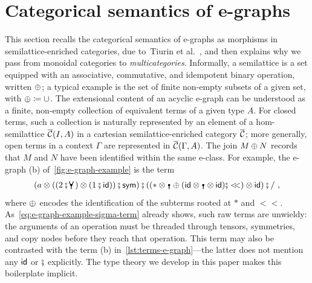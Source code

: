 \section{Categorical semantics of e-graphs}
\label{sec:categorical-semantics}

This section recalls the categorical semantics of e-graphs as morphisms in semilattice-enriched categories, due to~Tiurin et al.~\cite{tiurin2025equivalencehypergraphsdporewriting}, and then explains why we pass from monoidal categories to \emph{multicategories}.
Informally, a semilattice is a set equipped with an associative, commutative, and idempotent binary operation, written $\mathbin{\oplus}$; a typical example is the set of finite non-empty subsets of a given set, with $\mathbin{\oplus} \coloneqq \cup$.
The extensional content of an acyclic e-graph can be understood as a finite, non-empty collection of equivalent terms of a given type $A$.
For closed terms, such a collection is naturally represented by an element of a hom-semilattice ${\overline{\mathcal{C}}}(I,A)$ in a cartesian semilattice-enriched category ${\overline{\mathcal{C}}}$; more generally, open terms in a context $\Gamma$ are represented in ${\overline{\mathcal{C}}}(\Gamma,A)$.
The join $M \mathbin{\oplus} N$ records that $M$ and $N$ have been identified within the same e-class.
For example, the e-graph (b) of~\autoref{fig:e-graph-example} is the term
\begin{align}
\label{eq:e-graph-example-sigma-term}
(a \otimes ((2\fatsemi\comonoid) \otimes (1\fatsemi \id))\fatsemi\sym)\fatsemi((* \otimes \counit \join (\id \otimes \counit \otimes \id)\fatsemi<\!\!<) \otimes \id)\fatsemi/~,
\end{align}
where $\mathbin{\oplus}$ encodes the identification of the subterms rooted at $*$ and $<\!\!<$.
As~\eqref{eq:e-graph-example-sigma-term} already shows, such raw terms are unwieldy: the arguments of an operation must be threaded through tensors, symmetries, and copy nodes before they reach that operation.
This term may also be contrasted with the term (b) in~\cref{lst:terms-e-graph}---the latter does not mention any $\textsf{id}$ or $\fatsemi$ explicitly.
The type theory we develop in this paper makes this boilerplate implicit.

